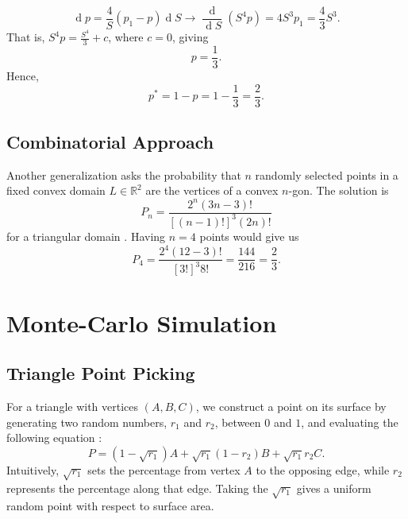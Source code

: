 \documentclass{article}
\DeclareMathOperator{\dif}{d}
\begin{document}
\begin{equation*}
    \dif p = \frac{4}{S}(p_{1} - p)\dif S \rightarrow \frac{\dif}{\dif S}(S^{4}p) = 4S^{3}p_{1} = \frac{4}{3}S^{3}.
\end{equation*}
That is, $S^{4}p = \tfrac{S^{4}}{3} + c$, where $c = 0$, giving
\begin{equation*}
    p = \frac{1}{3}.
\end{equation*}
Hence,
\begin{equation*}
    p^{*} =  1 - p = 1 - \frac{1}{3} = \frac{2}{3}.
\end{equation*}

\subsection{Combinatorial Approach}

Another generalization asks the probability that $n$ randomly selected points in a fixed convex domain $L\in\mathbb{R}^{2}$ are the vertices of a convex $n$-gon.
The solution is
\begin{equation*}
    P_{n} = \frac{2^{n}(3n - 3)!}{[(n - 1)!]^{3}(2n)!}
\end{equation*}
for a triangular domain \cite{valtr}.
Having $n = 4$ points would give us
\begin{equation*}
    P_{4} = \frac{2^{4}(12 - 3)!}{[3!]^{3}8!} = \frac{144}{216} = \frac{2}{3}.
\end{equation*}

\newpage 

\section{Monte-Carlo Simulation}

\subsection{Triangle Point Picking}
For a triangle with vertices $(A, B, C)$, we construct a point on its surface by generating two random numbers, $r_1$ and $r_2$, between $0$ and $1$, and evaluating the following equation \cite{shape}:
\begin{equation*}
    P = (1 - \sqrt{r_{1}})A + \sqrt{r_{1}}(1 - r_{2})B + \sqrt{r_{1}}r_{2}C.
\end{equation*}
Intuitively, $\sqrt{r_{1}}$ sets the percentage from vertex $A$ to the opposing edge, while $r_{2}$ represents the percentage along that edge. 
Taking the $\sqrt{r_{1}}$ gives a uniform random point with respect to surface area.
\end{document}
